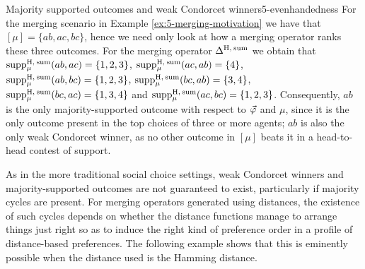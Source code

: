 \begin{xmpl}{Majority supported outcomes and weak Condorcet winners}{5-evenhandedness}
	For the merging scenario in Example \ref{ex:5-merging-motivation}
	we have that $[\mu]=\{ab,ac,bc\}$, 
	hence we need only look at how a merging operator ranks these three outcomes.
	For the merging operator $\me^{\hamming,\:\ssum}$
	we obtain that
	$\supp^{\hamming,\:\ssum}_\mu(ab,ac)=\{1,2,3\}$,
	$\supp^{\hamming,\:\ssum}_\mu(ac,ab)=\{4\}$,
	$\supp^{\hamming,\:\ssum}_\mu(ab,bc)=\{1,2,3\}$,
	$\supp^{\hamming,\:\ssum}_\mu(bc,ab)=\{3,4\}$,
	$\supp^{\hamming,\:\ssum}_\mu(bc,ac)=\{1,3,4\}$
	and
	$\supp^{\hamming,\:\ssum}_\mu(ac,bc)=\{1,2,3\}$.
	Consequently,
	$ab$ is the only majority-supported outcome with respect to $\P$ and $\mu$,
	since it is the only outcome present in the top choices of three or more agents;
	$ab$ is also the only weak Condorcet winner, as no other outcome
	in $[\mu]$ beats it in a head-to-head contest of support.
\end{xmpl}

As in the more traditional social choice settings,
weak Condorcet winners and majority-supported outcomes 
are not guaranteed to exist, particularly if majority cycles are present.
For merging operators generated using distances, the existence 
of such cycles depends on whether the distance functions 
manage to arrange things just right so as to induce the right 
kind of preference order in a profile of distance-based preferences.
The following example shows that this is eminently possible
when the distance used is the Hamming distance.

